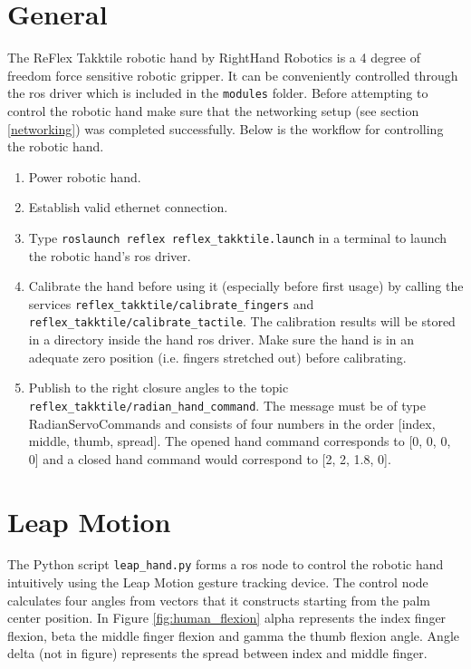 \documentclass[headsepline,footinclude=false,fontsize=11pt,paper=a4,listof=totoc,bibliography=totoc,BCOR=12mm,DIV=14]{scrbook}
\begin{document}
\section{General}

The ReFlex Takktile robotic hand by RightHand Robotics is a 4 degree of freedom force sensitive robotic gripper. It can be conveniently controlled through the \gls{ros} driver which is included in the \texttt{modules} folder. Before attempting to control the robotic hand make sure that the networking setup (see section \ref{networking}) was completed successfully. Below is the workflow for controlling the robotic hand.

\begin{enumerate}
\item Power robotic hand.
\item Establish valid ethernet connection.
\item Type \texttt{roslaunch reflex reflex\_takktile.launch} in a terminal to launch the robotic hand's \gls{ros} driver.
\item Calibrate the hand before using it (especially before first usage) by calling the services \texttt{reflex\_takktile/calibrate\_fingers} and \texttt{reflex\_takktile/calibrate\_tactile}. \newline The calibration results will be stored in a directory inside the hand \gls{ros} driver. Make sure the hand is in an adequate zero position (i.e. fingers stretched out) before calibrating. 
\item Publish to the right closure angles to the topic \texttt{reflex\_takktile/radian\_hand\_command}. The message must be of type RadianServoCommands and consists of four numbers in the order [index, middle, thumb, spread]. The opened hand command corresponds to [0, 0, 0, 0] and a closed hand command would correspond to [2, 2, 1.8, 0].
\end{enumerate}

\section{Leap Motion}



The Python script \texttt{leap\_hand.py} forms a \gls{ros} node to control the robotic hand intuitively using the Leap Motion gesture tracking device. The control node calculates four angles from vectors that it constructs starting from the palm center position. In Figure \ref{fig:human_flexion} alpha represents the index finger flexion, beta the middle finger flexion and gamma the thumb flexion angle. Angle delta (not in figure) represents the spread between index and middle finger. 
\end{document}
